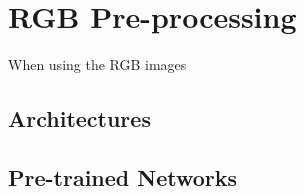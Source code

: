 \documentclass[11pt]{article} %
\begin{document}

\section{RGB Pre-processing}

When using the RGB images

\subsection{Architectures}




\subsection{Pre-trained Networks}












\end{document}
